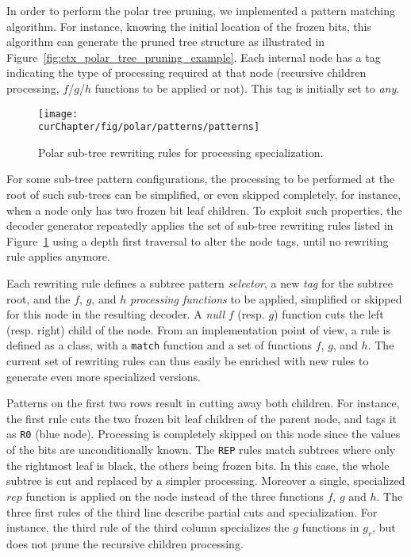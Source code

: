 In order to perform the polar tree pruning, we implemented a pattern matching
algorithm. For instance, knowing the initial location of the frozen bits, this
algorithm can generate the pruned tree structure as illustrated in
Figure~\ref{fig:ctx_polar_tree_pruning_example}. Each internal node has a tag
indicating the type of processing required at that node (recursive children
processing, $f$/$g$/$h$ functions to be applied or not). This tag is initially
set to \emph{any}.

\begin{figure}[htp]
  \centering
  \texttt{[image: \\curChapter/fig/polar/patterns/patterns]}
  \caption{Polar sub-tree rewriting rules for processing specialization.}
  \label{fig:opt_polar_patterns}
\end{figure}

For some sub-tree pattern configurations, the processing to be performed at the
root of such sub-trees can be simplified, or even skipped completely, for
instance, when a node only has two frozen bit leaf children. To exploit such
properties, the decoder generator repeatedly applies the set of sub-tree
rewriting rules listed in Figure~\ref{fig:opt_polar_patterns} using a depth
first traversal to alter the node tags, until no rewriting rule applies anymore.

Each rewriting rule defines a subtree pattern \emph{selector}, a new \emph{tag}
for the subtree root, and the $f$, $g$, and $h$ \emph{processing functions} to
be applied, simplified or skipped for this node in the resulting decoder. A
\emph{null} $f$ (resp. $g$) function cuts the left (resp. right) child of the
node. From an implementation point of view, a rule is defined as a class, with a
\verb|match| function and a set of functions $f$, $g$, and $h$. The current
set of rewriting rules can thus easily be enriched with new rules to generate
even more specialized versions.

Patterns on the first two rows result in cutting away both children. For
instance, the first rule cuts the two frozen bit leaf children of the parent
node, and tags it as \verb|R0| (blue node). Processing is completely skipped on
this node since the values of the bits are unconditionally known. The \verb|REP|
rules match subtrees where only the rightmost leaf is black, the others being
frozen bits. In this case, the whole subtree is cut and replaced by a simpler
processing. Moreover a single, specialized $rep$ function is applied on the node
instead of the three functions $f$, $g$ and $h$. The three first rules of the
third line describe partial cuts and specialization. For instance, the third
rule of the third column specializes the $g$ functions in $g_r$, but does not
prune the recursive children processing.

